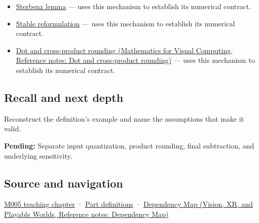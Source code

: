 \begin{itemize}
\tightlist
\item
  \hyperref[appendix-399b7ad53f39]{Sterbenz lemma} --- uses this mechanism to establish its numerical contract.
\item
  \hyperref[appendix-d7f8ba961670]{Stable reformulation} --- uses this mechanism to establish its numerical contract.
\item
  \href{../02-Mathematics-for-Visual-Computing/main.pdf\#nameddest=appendix-5aef4f13483a}{Dot and cross-product rounding (Mathematics for Visual Computing, Reference notes: Dot and cross-product rounding)} --- uses this mechanism to establish its numerical contract.
\end{itemize}

\subsection{Recall and next depth}\label{appendix-a2773a6a2f9d-recall-and-next-depth}

Reconstruct the definition's example and name the assumptions that make it valid.

\textbf{Pending:} Separate input quantization, product rounding, final subtraction, and underlying sensitivity.

\subsection{Source and navigation}\label{appendix-a2773a6a2f9d-source-and-navigation}

\hyperref[01-foundations-i-ch001-when-arithmetic-meets-uncertainty]{M005 teaching chapter} · \hyperref[appendix-fd090d982a15-m005---parts-77-88]{Part definitions} · \href{../07-Vision-XR-and-Playable-Worlds/main.pdf\#nameddest=appendix-4ad47bdd269a}{Dependency Map (Vision, XR, and Playable Worlds, Reference notes: Dependency Map)}
